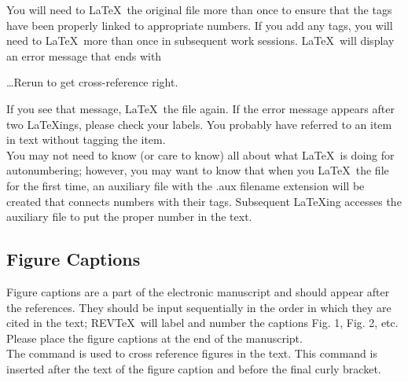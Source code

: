      You will need to \LaTeX\ the original file more than once to
ensure that the tags have been properly linked to appropriate
numbers.  If you add any tags, you will need to \LaTeX\ more than
once in subsequent work sessions.  \LaTeX\ will display an error
message that ends with

\begin{center} \ldots Rerun to get cross-reference right.
\end{center}

     If you see that message, \LaTeX\ the file again.  If the error
message appears after two \LaTeX ings, please check your labels.
You probably have referred to an item in text without tagging the
item.                \\

     You may not need to know (or care to know) all about what
\LaTeX\ is doing for autonumbering; however, you may want to know
that when you \LaTeX\ the file for the first time, an auxiliary
file with the .aux filename extension will be created that
connects numbers with their tags.  Subsequent \LaTeX ing accesses
the auxiliary file to put the proper number in the text.


\subsection{  Figure Captions}

     Figure captions are a part of the electronic manuscript and
should appear after the references.  They should be input
sequentially in the order in which they are cited in the text;
REV\TeX\  will label and number the captions Fig. 1, Fig. 2, etc.
Please place the figure captions at the end of the manuscript. \\

     The  command is used to cross reference figures
in the text.  This command is inserted after the text of the figure
caption and before the final curly bracket.\\


